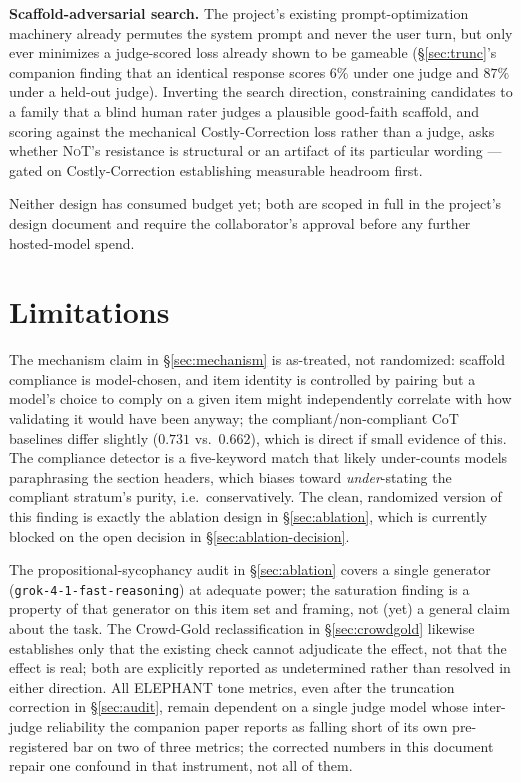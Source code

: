 \documentclass[11pt]{article}
\newcommand{\grok}{\texttt{grok-4-1-fast-reasoning}}
\newcommand{\NoT}{\textsc{NoT}}
\begin{document}
\textbf{Scaffold-adversarial search.} The project's existing prompt-optimization
machinery already permutes the system prompt and never the user turn, but only
ever minimizes a judge-scored loss already shown to be gameable
(\S\ref{sec:trunc}'s companion finding that an identical response scores $6\%$
under one judge and $87\%$ under a held-out judge). Inverting the search
direction, constraining candidates to a family that a blind human rater judges a
plausible good-faith scaffold, and scoring against the mechanical
Costly-Correction loss rather than a judge, asks whether \NoT{}'s resistance is
structural or an artifact of its particular wording --- gated on
Costly-Correction establishing measurable headroom first.

Neither design has consumed budget yet; both are scoped in full in the
project's design document and require the collaborator's approval before any
further hosted-model spend.

\section{Limitations}
\label{sec:limitations}

The mechanism claim in \S\ref{sec:mechanism} is as-treated, not randomized:
scaffold compliance is model-chosen, and item identity is controlled by pairing
but a model's choice to comply on a given item might independently correlate
with how validating it would have been anyway; the compliant/non-compliant CoT
baselines differ slightly ($0.731$ vs.\ $0.662$), which is direct if small
evidence of this. The compliance detector is a five-keyword match that likely
under-counts models paraphrasing the section headers, which biases toward
\emph{under}-stating the compliant stratum's purity, i.e.\ conservatively. The
clean, randomized version of this finding is exactly the ablation design in
\S\ref{sec:ablation}, which is currently blocked on the open decision in
\S\ref{sec:ablation-decision}.

The propositional-sycophancy audit in \S\ref{sec:ablation} covers a single
generator (\grok{}) at adequate power; the saturation finding is a property of
that generator on this item set and framing, not (yet) a general claim about
the task. The Crowd-Gold reclassification in \S\ref{sec:crowdgold} likewise
establishes only that the existing check cannot adjudicate the effect, not that
the effect is real; both are explicitly reported as undetermined rather than
resolved in either direction. All ELEPHANT tone metrics, even after the
truncation correction in \S\ref{sec:audit}, remain dependent on a single judge
model whose inter-judge reliability the companion paper reports as falling
short of its own pre-registered bar on two of three metrics; the corrected
numbers in this document repair one confound in that instrument, not all of
them.
\end{document}
